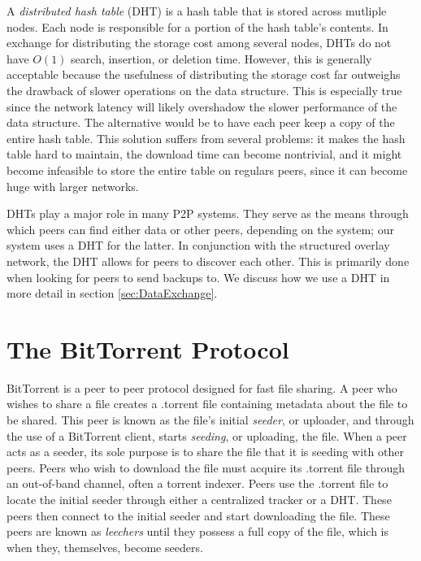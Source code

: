 \documentclass[12pt]{report}
\begin{document}
A \textit{distributed hash table} (DHT) is a hash table that is stored across mutliple nodes. Each node is responsible for a portion of the hash table's contents. In exchange for distributing the storage cost among several nodes, DHTs do not have $O(1)$ search, insertion, or deletion time. However, this is generally acceptable because the usefulness of distributing the storage cost far outweighs the drawback of slower operations on the data structure. This is especially true since the network latency will likely overshadow the slower performance of the data structure. The alternative would be to have each peer keep a copy of the entire hash table. This solution suffers from several problems: it makes the hash table hard to maintain, the download time can become nontrivial, and it might become infeasible to store the entire table on regulars peers, since it can become huge with larger networks.




DHTs play a major role in many P2P systems. They serve as the means through which peers can find either data or other peers, depending on the system; our system uses a DHT for the latter. In conjunction with the structured overlay network, the DHT allows for peers to discover each other. This is primarily done when looking for peers to send backups to. We discuss how we use a DHT in more detail in section \ref{sec:DataExchange}.

\section{The BitTorrent Protocol} \label{sec:TheBitTorrentProtocol}
BitTorrent is a peer to peer protocol designed for fast file sharing. A peer who wishes to share a file creates a .torrent file containing metadata about the file to be shared. This peer is known as the file's initial \textit{seeder}, or uploader, and through the use of a BitTorrent client, starts \textit{seeding}, or uploading, the file. When a peer acts as a seeder, its sole purpose is to share the file that it is seeding with other peers. Peers who wish to download the file must acquire its .torrent file through an out-of-band channel, often a torrent indexer. Peers use the .torrent file to locate the initial seeder through either a centralized tracker or a DHT. These peers then connect to the initial seeder and start downloading the file. These peers are known as \textit{leechers} until they possess a full copy of the file, which is when they, themselves, become seeders.
\end{document}
